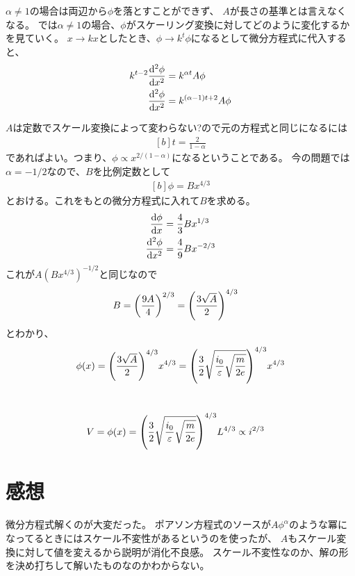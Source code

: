 \documentclass[../ap_2013.tex]{subfiles}
\begin{document}
\(\alpha\neq 1\)の場合は両辺から\(\phi\)を落とすことができず、
\(A\)が長さの基準とは言えなくなる。
では\(\alpha \neq 1\)の場合、\(\phi\)がスケーリング変換に対してどのように変化するかを見ていく。
\(x\to k x\)としたとき、\(\phi\to k^t\phi\)になるとして微分方程式に代入すると、
\begin{equation}\begin{aligned}[b]
    k^{t-2}\dv[2]{\phi}{x} &= k^{\alpha t}A\phi\\
    \dv[2]{\phi}{x} &= k^{(\alpha-1) t+2}A\phi\\
\end{aligned}\end{equation}
\(A\)は定数でスケール変換によって変わらない?ので元の方程式と同じになるには
\begin{equation}\begin{aligned}[b]
    t = \frac{2}{1-\alpha}
\end{aligned}\end{equation}
であればよい。つまり、\(\phi \propto x^{2/(1-\alpha)}\)になるということである。
今の問題では\(\alpha=-1/2\)なので、\(B\)を比例定数として
\begin{equation}\begin{aligned}[b]
    \phi = Bx^{4/3}
\end{aligned}\end{equation}
とおける。これをもとの微分方程式に入れて\(B\)を求める。
\begin{equation}\begin{aligned}[b]
    \dv{\phi}{x} &= \frac{4}{3}Bx^{1/3}\\
    \dv[2]{\phi}{x} &= \frac{4}{9}Bx^{-2/3}
\end{aligned}\end{equation}
これが\(A(Bx^{4/3})^{-1/2}\)と同じなので
\begin{equation}\begin{aligned}[b]
    B &= \qty(\frac{9A}{4})^{2/3}=\qty(\frac{3\sqrt{A}}{2})^{4/3}
\end{aligned}\end{equation}
とわかり、
\begin{equation}\begin{aligned}[b]
    \phi(x) = \qty(\frac{3\sqrt{A}}{2})^{4/3}x^{4/3} =\qty(\frac{3}{2}\sqrt{\frac{i_0}{\varepsilon}\sqrt{\frac{m}{2e}}})^{4/3}x^{4/3}
\end{aligned}\end{equation}

\section{}
\begin{equation}\begin{aligned}[b]
    V &= \phi(x) =\qty(\frac{3}{2}\sqrt{\frac{i_0}{\varepsilon}\sqrt{\frac{m}{2e}}})^{4/3}L^{4/3} \propto i^{2/3}
\end{aligned}\end{equation}

\section*{感想}
微分方程式解くのが大変だった。
ポアソン方程式のソースが\(A\phi^\alpha\)のような冪になってるときにはスケール不変性があるというのを使ったが、
\(A\)もスケール変換に対して値を変えるから説明が消化不良感。
スケール不変性なのか、解の形を決め打ちして解いたものなのかわからない。
\end{document}
